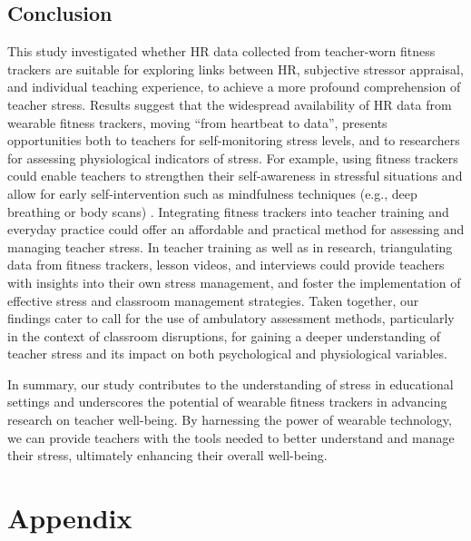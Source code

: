 \documentclass[preprint, 3p,
authoryear]{elsarticle} %
\begin{document}
\subsection{Conclusion}\label{conclusion}

This study investigated whether HR data collected from teacher-worn
fitness trackers are suitable for exploring links between HR, subjective
stressor appraisal, and individual teaching experience, to achieve a
more profound comprehension of teacher stress. Results suggest that the
widespread availability of HR data from wearable fitness trackers,
moving ``from heartbeat to data'', presents opportunities both to
teachers for self-monitoring stress levels, and to researchers for
assessing physiological indicators of stress. For example, using fitness
trackers could enable teachers to strengthen their self-awareness in
stressful situations and allow for early self-intervention such as
mindfulness techniques (e.g., deep breathing or body scans)
\citep{agyapong2023interventions}. Integrating fitness trackers into
teacher training and everyday practice could offer an affordable and
practical method for assessing and managing teacher stress. In teacher
training as well as in research, triangulating data from fitness
trackers, lesson videos, and interviews could provide teachers with
insights into their own stress management, and foster the implementation
of effective stress and classroom management strategies. Taken together,
our findings cater to \citet{wettstein2021} call for the use of
ambulatory assessment methods, particularly in the context of classroom
disruptions, for gaining a deeper understanding of teacher stress and
its impact on both psychological and physiological variables.

In summary, our study contributes to the understanding of stress in
educational settings and underscores the potential of wearable fitness
trackers in advancing research on teacher well-being. By harnessing the
power of wearable technology, we can provide teachers with the tools
needed to better understand and manage their stress, ultimately
enhancing their overall well-being.

\newpage
\appendix
\section*{Appendix}

\setcounter{figure}{0}  %

\renewcommand{\thefigure}{A\arabic{figure}}  %
\end{document}
